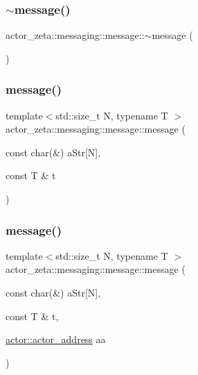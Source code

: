 \subsubsection{\texorpdfstring{$\sim$message()}{~message()}}
{\footnotesize\ttfamily actor\+\_\+zeta\+::messaging\+::message\+::$\sim$message (\begin{DoxyParamCaption}{ }\end{DoxyParamCaption})\hspace{0.3cm}{\ttfamily [default]}}

\mbox{\label{classactor__zeta_1_1messaging_1_1message_a477f95504ed3d8ea6097dfaa1b053ade}} 
\subsubsection{\texorpdfstring{message()}{message()}\hspace{0.1cm}{\footnotesize\ttfamily [4/11]}}
{\footnotesize\ttfamily template$<$std\+::size\+\_\+t N, typename T $>$ \\
actor\+\_\+zeta\+::messaging\+::message\+::message (\begin{DoxyParamCaption}\item[{const char(\&)}]{a\+Str\mbox{[}\+N\mbox{]},  }\item[{const T \&}]{t }\end{DoxyParamCaption})\hspace{0.3cm}{\ttfamily [inline]}}

\mbox{\label{classactor__zeta_1_1messaging_1_1message_a00398df5618923c839797568ce955d69}} 
\subsubsection{\texorpdfstring{message()}{message()}\hspace{0.1cm}{\footnotesize\ttfamily [5/11]}}
{\footnotesize\ttfamily template$<$std\+::size\+\_\+t N, typename T $>$ \\
actor\+\_\+zeta\+::messaging\+::message\+::message (\begin{DoxyParamCaption}\item[{const char(\&)}]{a\+Str\mbox{[}\+N\mbox{]},  }\item[{const T \&}]{t,  }\item[{\hyperlink{classactor__zeta_1_1actor_1_1actor__address}{actor\+::actor\+\_\+address}}]{aa }\end{DoxyParamCaption})\hspace{0.3cm}{\ttfamily [inline]}}

